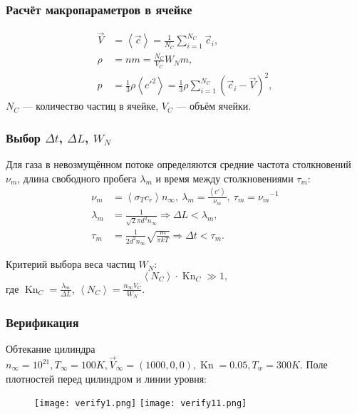 \documentclass[onlymath]{beamer}
\newcommand\avg[1]{\left\langle{#1}\right\rangle}
\DeclareMathOperator\Kn{Kn}
\newcommand{\ts}{\Delta t}
\newcommand{\sps}{\Delta L}
\newcommand{\statw}{W_N}
\newcommand{\fp}{\lambda_m}
\newcommand{\ft}{\tau_m}
\newcommand{\cf}{\nu_m}
\newcommand{\ccs}{\sigma_T}
\newcommand\then{\Rightarrow}
\newcommand\flowvel{\vec{V}_{\infty}}
\newcommand\flowtemp{T_{\infty}}
\newcommand\flowcon{n_{\infty}}
\begin{document}
\begin{frame}
  \frametitle{Расчёт макропараметров в ячейке}
  \begin{equation*}
    \begin{aligned}
        \vec{V} &= \avg{\vec{c}} = 
        \frac{1}{N_C}\sum_{i = 1}^{N_C}{\vec{c}_i},\\
        \rho &= nm = \frac{N_C}{V_C}\statw m,\\
        p &= \frac{1}{3}\rho\avg{c'^2} = 
        \frac{1}{3}\rho\sum_{i=1}^{N_C}(\vec{c}_i - \vec{V})^2,
      \end{aligned}
    \end{equation*}
    $N_C$ — количество частиц в ячейке, $V_C$ — объём ячейки.
\end{frame}

\begin{frame}
  \frametitle{Выбор $\ts$, $\sps$, $\statw$}
  Для газа в невозмущённом потоке определяются средние частота
  столкновений $\cf$, длина свободного пробега $\fp$ и время между
  столкновениями $\ft$:
    \begin{equation*}
      \begin{aligned}
        \cf &= \avg{\ccs c_r} \flowcon,\:\fp = \frac{\avg{c'}}{\cf},\:\ft = {\cf}^{-1}\\
        \fp &= \frac{1}{\sqrt{2} \pi d^2 \flowcon} \then \sps < \fp,\\
        \ft &= \frac{1}{2d^2 \flowcon}\sqrt{\frac{m}{\pi k T}} \then \ts < \ft.
      \end{aligned}
    \end{equation*}
  
    Критерий выбора веса частиц $\statw$:
    \begin{equation*}
      \avg{N_C}\cdot\Kn_C \gg 1,
    \end{equation*}
    где $\Kn_C = \frac{\fp}{\sps}$, $\avg{N_C} = \frac{\flowcon V_C}{W_N}$.
\end{frame}


\begin{frame}
  \frametitle{Верификация}
  Обтекание цилиндра $\flowcon = 10^{21}, \flowtemp = 100K, \flowvel =
  (1000, 0, 0), \Kn = 0.05, T_w = 300K$. Поле плотностей перед
  цилиндром и линии уровня:
  \begin{figure}
    \centering
    \texttt{[image: verify1.png]}
    \texttt{[image: verify11.png]}
  \end{figure}
\end{frame}
\end{document}
